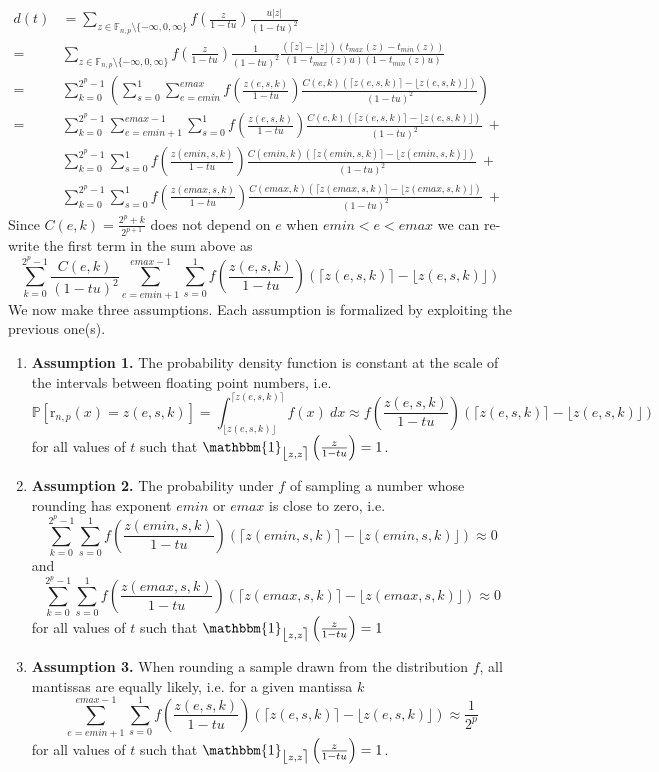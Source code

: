 \documentclass[10pt,a4paper]{article}
\theoremstyle{plain}
\theoremstyle{definition}
\newcommand{\F}[1][n,p]{\mathbb{F}_{#1}}
\newcommand{\Round}[1][n,p]{\mathrm{r}_{#1}}
\newcommand{\one}{\mathbbm{1}}
\newcommand{\ceil}[1]{\lceil #1 \rceil}
\newcommand{\floor}[1]{\lfloor #1 \rfloor}
\newcommand{\fintvl}[1][x]{\mathlarger{\lfloor}#1,#1\mathlarger{\rceil}}
\newcommand{\absv}[1]{\vert #1\vert}
\newcommand{\Pro}[1]{\mathbb{P}\left[ #1 \right]}
\begin{document}
\begin{align}
d(t)&=\sum_{z\in \F\setminus\{-\infty,0,\infty\}}f\left(\frac{z}{1-tu}\right) \frac{u\absv{z}}{(1-tu)^2}\nonumber
\\
=&\sum_{z\in \F\setminus\{-\infty,0,\infty\}}f\left(\frac{z}{1-tu}\right) \frac{1}{(1-tu)^2}\frac{(\ceil{z}-\floor{z})(t_{max}(z)-t_{min}(z))}{(1-t_{max}(z)u)(1-t_{min}(z)u)}&\nonumber
\\
=&\sum_{k=0}^{2^{p}-1}\left(\sum_{s=0}^1\sum_{e=emin}^{emax}f\left(\frac{z(e,s,k)}{1-tu}\right)\frac{C(e,k)(\ceil{z(e,s,k)}-\floor{z(e,s,k)})}{(1-tu)^2}\right)\nonumber 
\\
=&\sum_{k=0}^{2^p-1}\sum_{e=emin+1}^{emax-1}\sum_{s=0}^1 f\left(\frac{z(e,s,k)}{1-tu}\right)\frac{C(e,k)(\ceil{z(e,s,k)}-\floor{z(e,s,k)})}{(1-tu)^2}~+ \nonumber
\\
& \sum_{k=0}^{2^{p}-1}\sum_{s=0}^1 f\left(\frac{z(emin,s,k)}{1-tu}\right)\frac{C(emin,k)(\ceil{z(emin,s,k)}-\floor{z(emin,s,k)})}{(1-tu)^2}~+ \nonumber
\\
& \sum_{k=0}^{2^{p}-1}\sum_{s=0}^1 f\left(\frac{z(emax,s,k)}{1-tu}\right)\frac{C(emax,k)(\ceil{z(emax,s,k)}-\floor{z(emax,s,k)})}{(1-tu)^2}~+ \label{eq:pdf1/2}
\end{align}
Since $C(e,k)=\frac{2^p+k}{2^{p+1}}$ does not depend on $e$ when $emin<e<emax$ we can re-write the first term in the sum above as
\[
\sum_{k=0}^{2^p-1}\frac{C(e,k)}{(1-tu)^2}\sum_{e=emin+1}^{emax-1}\sum_{s=0}^1 f\left(\frac{z(e,s,k)}{1-tu}\right)(\ceil{z(e,s,k)}-\floor{z(e,s,k)})
\]
We now make three assumptions. Each assumption is formalized by exploiting the previous one(s).

\begin{enumerate}
\item \textbf{Assumption 1.} The probability density function is constant at the scale of the intervals between floating point numbers, i.e.
\[
\Pro{\Round(x)=z(e,s,k)}=\int_{\floor{z(e,s,k)}}^{\ceil{z(e,s,k)}} f(x)~dx \approx f\left(\frac{z(e,s,k)}{1-tu}\right)(\ceil{z(e,s,k)}-\floor{z(e,s,k)})
\]
for all values of $t$ such that $\one_{\fintvl[z]}\left(\frac{z}{1-tu}\right)=1$.
\item \textbf{Assumption 2.} The probability under $f$ of sampling a number whose rounding has exponent $emin$ or $emax$ is close to zero, i.e.
\[
 \sum_{k=0}^{2^{p}-1}\sum_{s=0}^1 f\left(\frac{z(emin,s,k)}{1-tu}\right)(\ceil{z(emin,s,k)}-\floor{z(emin,s,k)})\approx 0
\]
and
\[
 \sum_{k=0}^{2^{p}-1}\sum_{s=0}^1 f\left(\frac{z(emax,s,k)}{1-tu}\right)(\ceil{z(emax,s,k)}-\floor{z(emax,s,k)})\approx 0
\]
for all values of $t$ such that $\one_{\fintvl[z]}\left(\frac{z}{1-tu}\right)=1$
\item \textbf{Assumption 3.} When rounding a sample drawn from the distribution $f$, all mantissas are equally likely, i.e. for a given mantissa $k$
\[
\sum_{e=emin+1}^{emax-1}\sum_{s=0}^1 f\left(\frac{z(e,s,k)}{1-tu}\right)(\ceil{z(e,s,k)}-\floor{z(e,s,k)})\approx \frac{1}{2^p}
\]
for all values of $t$ such that $\one_{\fintvl[z]}\left(\frac{z}{1-tu}\right)=1$.
\end{enumerate}
\end{document}
